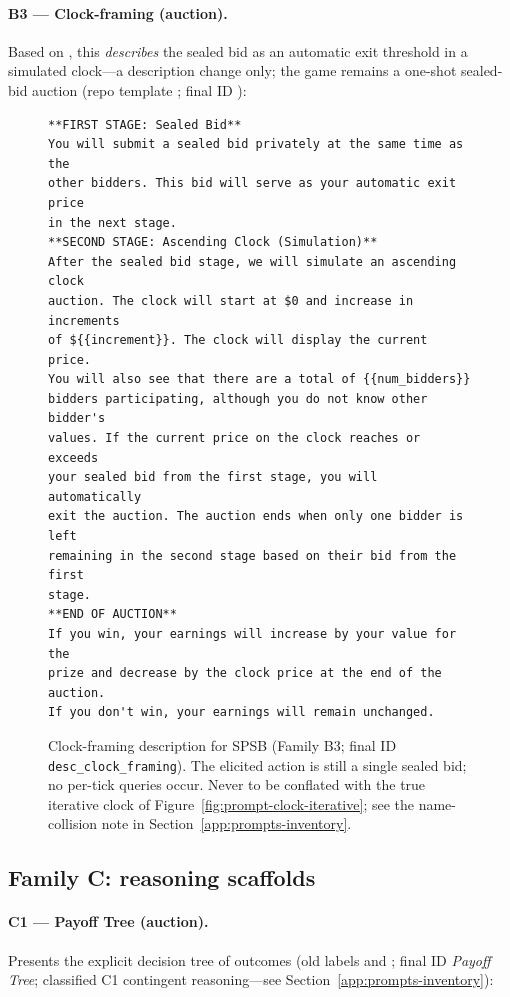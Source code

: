 \paragraph{B3 --- Clock-framing (auction).} Based on \citet{breitmoser2022obviousness}, this \emph{describes} the sealed bid as an automatic exit threshold in a simulated clock---a description change only; the game remains a one-shot sealed-bid auction (repo template ; final ID ):

\begin{figure}[H]
\begin{lstlisting}
**FIRST STAGE: Sealed Bid**
You will submit a sealed bid privately at the same time as the
other bidders. This bid will serve as your automatic exit price
in the next stage.
**SECOND STAGE: Ascending Clock (Simulation)**
After the sealed bid stage, we will simulate an ascending clock
auction. The clock will start at $0 and increase in increments
of ${{increment}}. The clock will display the current price.
You will also see that there are a total of {{num_bidders}}
bidders participating, although you do not know other bidder's
values. If the current price on the clock reaches or exceeds
your sealed bid from the first stage, you will automatically
exit the auction. The auction ends when only one bidder is left
remaining in the second stage based on their bid from the first
stage.
**END OF AUCTION**
If you win, your earnings will increase by your value for the
prize and decrease by the clock price at the end of the auction.
If you don't win, your earnings will remain unchanged.
\end{lstlisting}
\caption{Clock-framing description for SPSB (Family B3; final ID \texttt{desc\_clock\_framing}). The elicited action is still a single sealed bid; no per-tick queries occur. Never to be conflated with the true iterative clock of Figure~\ref{fig:prompt-clock-iterative}; see the name-collision note in Section~\ref{app:prompts-inventory}.}
\label{fig:prompt-clock-framing}
\end{figure}

\subsection{Family C: reasoning scaffolds}\label{app:prompts-scaffold}

\paragraph{C1 --- Payoff Tree (auction).} Presents the explicit decision tree of outcomes (old labels  and ; final ID \emph{Payoff Tree}; classified C1 contingent reasoning---see Section~\ref{app:prompts-inventory}):

